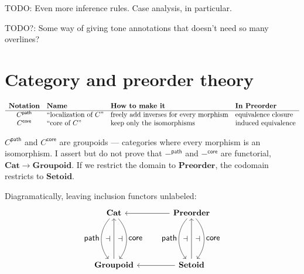 \documentclass{article}
\newcommand{\todo}[1]{{\color{red}#1}}
\newcommand{\ms}[1]{\ensuremath{\mathsf{#1}}}
\newcommand{\mb}[1]{\ensuremath{\mathbf{#1}}}
\newcommand{\iso}{\ms{core}}
\renewcommand{\path}{\ms{path}}
\begin{document}
\todo{TODO: Even more inference rules. Case analysis, in particular.}

\todo{TODO?: Some way of giving tone annotations that doesn't need so many
  overlines?}


\section{Category and preorder theory}

\[
\begin{array}{clll}
  \multicolumn{1}{l}{\textbf{Notation}}
  & \multicolumn{1}{l}{\textbf{Name}}
  & \multicolumn{1}{l}{\textbf{How to make it}}
  & \multicolumn{1}{l}{\textbf{In $\mb{Preorder}$}}
  \\\hline
  C^\path
  & \text{``localization of $C$''}
  & \text{freely add inverses for every morphism}
  & \text{equivalence closure}
  \\
  C^\iso
  & \text{``core of $C$''}
  & \text{keep only the isomorphisms}
  & \text{induced equivalence}
\end{array}
\]

$C^\path$ and $C^\iso$ are groupoids --- categories where every morphism is an
isomorphism. I assert but do not prove that $-^\path$ and $-^\iso$ are
functorial, $\mb{Cat} \to \mb{Groupoid}$. If we restrict the domain to
$\mb{Preorder}$, the codomain restricts to $\mb{Setoid}$.

Diagramatically, leaving inclusion functors unlabeled:
{\large\[
  \tikzset{
    no line/.style={draw=none,
      commutative diagrams/every label/.append style={/tikz/auto=false}}}
  \begin{tikzcd}[row sep=5em,column sep=4em]
    \mb{Cat}
    \arrow[d,bend right=40,"\textstyle\path"'{name=A}]
    \arrow[d,bend left=40,"\textstyle\iso"{name=C}]
    & \mb{Preorder}
    \arrow[d,bend right=40,"\textstyle\path"'{name=A2}]
    \arrow[d,bend left=40,"\textstyle\iso"{name=C2}]
    \arrow[l]
    \\
    \mb{Groupoid} \arrow[u,""{name=B}]
    & \mb{Setoid} \arrow{u}[name=B2]{} \arrow[l]
    \arrow[to path={(A) -- (B)\tikztonodes}, no line, near end]{}{\displaystyle\dashv}
    \arrow[to path={(B) -- (C)\tikztonodes}, no line]{}{\displaystyle\dashv}
    \arrow[to path={(A2) -- (B2)\tikztonodes}, no line, near end]{}{\displaystyle\dashv}
    \arrow[to path={(B2) -- (C2)\tikztonodes}, no line]{}{\displaystyle\dashv}
  \end{tikzcd}
\]}
\end{document}

